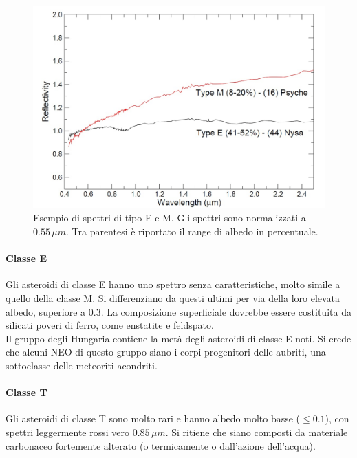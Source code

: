 \begin{figure}[h]
    \centering
    \includegraphics[scale=0.3]{figure/spettro_em.jpg}
    \caption[Esempio di spettri di tipo E e M.]{Esempio di spettri di tipo E e M. Gli spettri sono normalizzati a $0.55\,\mu m$. Tra parentesi è riportato il range di albedo in percentuale. \citep{magrin_spectroscopic_nodate}}
    \label{spettro_em}
\end{figure}

\paragraph*{Classe E}
Gli asteroidi di classe E hanno uno spettro senza caratteristiche, molto simile a quello della classe M. Si differenziano da questi ultimi per via della loro elevata albedo, superiore a $0.3$. La composizione superficiale dovrebbe essere costituita da silicati poveri di ferro, come enstatite e feldspato.\\
Il gruppo degli Hungaria contiene la metà degli asteroidi di classe E noti. Si crede che alcuni NEO di questo gruppo siano i corpi progenitori delle aubriti, una sottoclasse delle meteoriti acondriti.

\paragraph*{Classe T}
Gli asteroidi di classe T sono molto rari e hanno albedo molto basse ($\leq 0.1$), con spettri leggermente rossi vero $0.85\,\mu m$. Si ritiene che siano composti da materiale carbonaceo fortemente
alterato (o termicamente o dall'azione dell'acqua).

